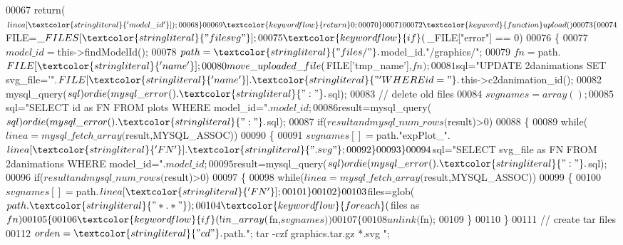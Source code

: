 \begin{DoxyCode}
00067       \textcolor{keywordflow}{return}($linea[\textcolor{stringliteral}{'model\_id'}]);
00068     \}
00069     \textcolor{keywordflow}{return} 0;
00070   \}
00071 
00072   \textcolor{keyword}{function} upload() 
00073   \{
00074     $FILE=$\_FILES[\textcolor{stringliteral}{"filesvg"}];
00075     \textcolor{keywordflow}{if} ($\_FILE[\textcolor{stringliteral}{"error"}] == 0)
00076     \{
00077       $model\_id=$this->findModelId();
00078       $path=\textcolor{stringliteral}{"files/"}.$model\_id.\textcolor{stringliteral}{"/graphics/"};
00079       $fn=$path.$FILE[\textcolor{stringliteral}{'name'}];
00080       move\_uploaded\_file($FILE[\textcolor{stringliteral}{'tmp\_name'}],$fn);
00081       $sql=\textcolor{stringliteral}{"UPDATE 2danimations SET svg\_file='"}.$FILE[\textcolor{stringliteral}{'name'}].\textcolor{stringliteral}{"' WHERE id="}.
      $this->c2danimation\_id();
00082       mysql\_query($sql) or die(mysql\_error().\textcolor{stringliteral}{": "}.$sql);
00083       \textcolor{comment}{// delete old files}
00084       $svgnames=array();
00085       $sql=\textcolor{stringliteral}{"SELECT id as FN  FROM plots WHERE model\_id="}.$model\_id;
00086       $result=mysql\_query($sql) or die(mysql\_error().\textcolor{stringliteral}{": "}.$sql);
00087       \textcolor{keywordflow}{if}($result and mysql\_num\_rows($result)>0)
00088       \{
00089         \textcolor{keywordflow}{while}($linea=mysql\_fetch\_array($result,MYSQL\_ASSOC))
00090         \{
00091           $svgnames[]=$path.\textcolor{stringliteral}{"expPlot\_"}.$linea[\textcolor{stringliteral}{'FN'}].\textcolor{stringliteral}{".svg"};
00092         \}
00093       \}
00094       $sql=\textcolor{stringliteral}{"SELECT svg\_file as FN FROM 2danimations WHERE model\_id="}.$model\_id;
00095       $result=mysql\_query($sql) or die(mysql\_error().\textcolor{stringliteral}{": "}.$sql);
00096       \textcolor{keywordflow}{if}($result and mysql\_num\_rows($result)>0)
00097       \{
00098         \textcolor{keywordflow}{while}($linea=mysql\_fetch\_array($result,MYSQL\_ASSOC))
00099         \{
00100           $svgnames[]=$path.$linea[\textcolor{stringliteral}{'FN'}];
00101         \}
00102       \}
00103       $files=glob($path.\textcolor{stringliteral}{"*.*"});
00104       \textcolor{keywordflow}{foreach}($files as $fn)
00105       \{
00106         \textcolor{keywordflow}{if}(!in\_array($fn,$svgnames))
00107         \{
00108           unlink($fn);
00109         \}
00110       \}
00111       \textcolor{comment}{// create tar files}
00112       $orden= \textcolor{stringliteral}{"cd "}.$path.\textcolor{stringliteral}{"; tar -czf graphics.tar.gz *.svg "};

\end{DoxyCode}

